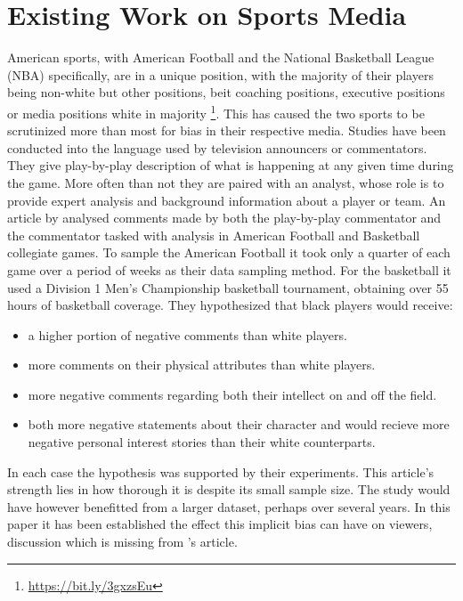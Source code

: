 \documentclass[oneside,12pt]{Classes/RoboticsLaTeX}
\begin{document}
\section{Existing Work on Sports Media}
American sports, with American Football and the National Basketball League (NBA) specifically, are in a unique position, with the majority
of their players being non-white but other positions, beit coaching positions, executive positions or media positions white in majority \footnote{\url{https://bit.ly/3gxzsEu}}.
This has caused the two sports to be scrutinized more than most for bias in their respective media.
Studies have been conducted into the language used by television announcers or commentators. They give play-by-play description of what is happening at any given
time during the game. More often than not they are paired with an analyst, whose role is to provide expert analysis and background information about a player or team. 
An article by \citep{ColorCoded} analysed comments made by both the play-by-play commentator and the commentator tasked with analysis in American Football and Basketball collegiate games.
To sample the American Football it took only a quarter of each game over a period of weeks as their data sampling method.
For the basketball it used a Division 1 Men's Championship basketball tournament, obtaining over 55 hours of basketball coverage. 
They hypothesized that black players would receive:
\begin{itemize}
  \item a higher portion of negative comments than white players.
  \item more comments on their physical attributes than white players.
  \item more negative comments regarding both their intellect on and off the field.
  \item both more negative statements about their character and would recieve more negative personal interest stories than their white counterparts.
\end{itemize}
In each case the hypothesis was supported by their experiments.
This article's strength lies in how thorough it is despite its small sample size. The study would have however benefitted from a larger dataset, perhaps over
several years. In this paper it has been established the effect this implicit bias can have on viewers, discussion which is missing from \citet{ColorCoded}'s article.
\end{document}
